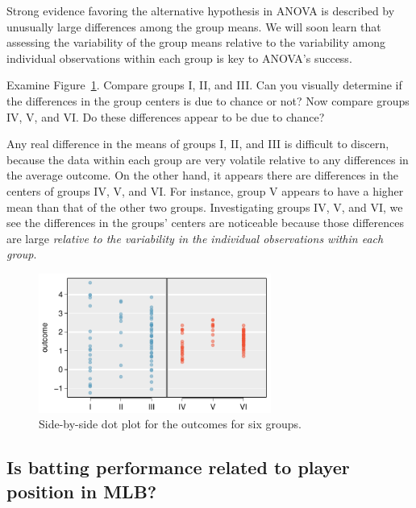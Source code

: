 Strong evidence favoring the alternative hypothesis in ANOVA is described by unusually large differences among the group means. We will soon learn that assessing the variability of the group means relative to the variability among individual observations within each group is key to ANOVA's success.

\begin{example}{Examine Figure~\ref{toyANOVA}. Compare groups I, II, and III. Can you visually determine if the differences in the group centers is due to chance or not? Now compare groups IV, V, and VI. Do these differences appear to be due to chance?}

Any real difference in the means of groups I, II, and III is difficult to discern, because the data within each group are very volatile relative to any differences in the average outcome. On the other hand, it appears there are differences in the centers of groups IV, V, and VI. For instance, group V appears to have a higher mean than that of the other two groups. Investigating groups IV, V, and VI, we see the differences in the groups' centers are noticeable because those differences are large \emph{relative to the variability in the individual observations within each group}.
\end{example}

\begin{figure}[h]
\centering
\includegraphics[width=0.68\textwidth]{ch_inference_for_means/figures/toyANOVA/toyANOVA}
\caption{Side-by-side dot plot for the outcomes for six groups.}
\label{toyANOVA}
\end{figure}


\subsection{Is batting performance related to player position in MLB?}


